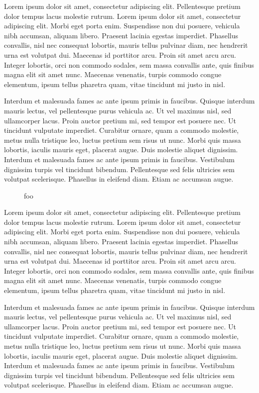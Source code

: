 \documentclass{article}
\begin{document}
\gdef\rcaption{foo}


Lorem ipsum dolor sit amet, consectetur adipiscing elit. Pellentesque pretium dolor tempus lacus molestie rutrum. Lorem ipsum dolor sit amet, consectetur adipiscing elit. Morbi eget porta enim. Suspendisse non dui posuere, vehicula nibh accumsan, aliquam libero. Praesent lacinia egestas imperdiet. Phasellus convallis, nisl nec consequat lobortis, mauris tellus pulvinar diam, nec hendrerit urna est volutpat dui. Maecenas id porttitor arcu. Proin sit amet arcu arcu. Integer lobortis, orci non commodo sodales, sem massa convallis ante, quis finibus magna elit sit amet nunc. Maecenas venenatis, turpis commodo congue elementum, ipsum tellus pharetra quam, vitae tincidunt mi justo in nisl.

Interdum et malesuada fames ac ante ipsum primis in faucibus. Quisque interdum mauris lectus, vel pellentesque purus vehicula ac. Ut vel maximus nisl, sed ullamcorper lacus. Proin auctor pretium mi, sed tempor est posuere nec. Ut tincidunt vulputate imperdiet. Curabitur ornare, quam a commodo molestie, metus nulla tristique leo, luctus pretium sem risus ut nunc. Morbi quis massa lobortis, iaculis mauris eget, placerat augue. Duis molestie aliquet dignissim. Interdum et malesuada fames ac ante ipsum primis in faucibus. Vestibulum dignissim turpis vel tincidunt bibendum. Pellentesque sed felis ultricies sem volutpat scelerisque. Phasellus in eleifend diam. Etiam ac accumsan augue.

\begin{figure}[h]
  \centering
  \resizebox{\linewidth}{!}{}
  \caption{\rcaption}
\end{figure}

Lorem ipsum dolor sit amet, consectetur adipiscing elit. Pellentesque pretium dolor tempus lacus molestie rutrum. Lorem ipsum dolor sit amet, consectetur adipiscing elit. Morbi eget porta enim. Suspendisse non dui posuere, vehicula nibh accumsan, aliquam libero. Praesent lacinia egestas imperdiet. Phasellus convallis, nisl nec consequat lobortis, mauris tellus pulvinar diam, nec hendrerit urna est volutpat dui. Maecenas id porttitor arcu. Proin sit amet arcu arcu. Integer lobortis, orci non commodo sodales, sem massa convallis ante, quis finibus magna elit sit amet nunc. Maecenas venenatis, turpis commodo congue elementum, ipsum tellus pharetra quam, vitae tincidunt mi justo in nisl.

Interdum et malesuada fames ac ante ipsum primis in faucibus. Quisque interdum mauris lectus, vel pellentesque purus vehicula ac. Ut vel maximus nisl, sed ullamcorper lacus. Proin auctor pretium mi, sed tempor est posuere nec. Ut tincidunt vulputate imperdiet. Curabitur ornare, quam a commodo molestie, metus nulla tristique leo, luctus pretium sem risus ut nunc. Morbi quis massa lobortis, iaculis mauris eget, placerat augue. Duis molestie aliquet dignissim. Interdum et malesuada fames ac ante ipsum primis in faucibus. Vestibulum dignissim turpis vel tincidunt bibendum. Pellentesque sed felis ultricies sem volutpat scelerisque. Phasellus in eleifend diam. Etiam ac accumsan augue.
\end{document}
